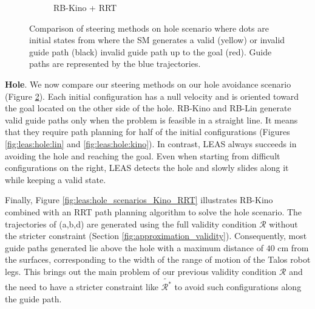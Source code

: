 \begin{figure}[h]
\begin{subfigure}[t]{0.4\linewidth}
    \caption{RB-Kino + RRT}
    \label{fig:leas:hole_scenarios_Kino_RRT}
    \label{fig:leas:hole:kino_rrt}
    \end{subfigure}
    \caption{Comparison of steering methods on hole scenario where dots are initial states from where the SM generates a valid (yellow) or invalid guide path (black) invalid guide path up to the goal (red). Guide paths are represented by the blue trajectories.}
    \label{fig:leas:hole_scenarios}
\end{figure}

\noindent\textbf{Hole}. We now compare our steering methods on our hole avoidance scenario (Figure \ref{fig:leas:hole_scenarios}). Each initial configuration has a null velocity and is oriented toward the goal located on the other side of the hole. 
RB-Kino and RB-Lin generate valid guide paths only when the problem is feasible in a straight line. It means that they require path planning for half of the initial configurations (Figures \ref{fig:leas:hole:lin} and \ref{fig:leas:hole:kino}).
In contrast, LEAS always succeeds in avoiding the hole and reaching the goal.
Even when starting from difficult configurations on the right, LEAS detects the hole and slowly slides along it while keeping a valid state.



Finally, Figure \ref{fig:leas:hole_scenarios_Kino_RRT} illustrates RB-Kino combined with an RRT path planning algorithm to solve the hole scenario. The trajectories of (a,b,d) are generated using the full validity condition $\mathcal{R}$ without the stricter constraint (Section \ref{fig:approximation_validity}). Consequently, most guide paths generated lie above the hole with a maximum distance of $40$ cm from the surfaces, corresponding to the width of the range of motion of the Talos robot legs. 
This brings out the main problem of our previous validity condition $\mathcal{R}$ and the need to have a stricter constraint like $\tilde{\mathcal{R}^*}$ to avoid such configurations along the guide path.


